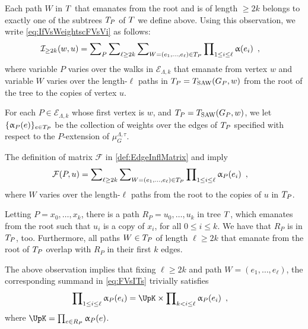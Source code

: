 \documentclass[11pt,reqno]{amsart}
\numberwithin{equation}{section}
\newcommand{\cE}{{\mathcal{E}}}
\newcommand{\cF}{{\mathcal{F}}}
\newcommand{\cI}{{\mathcal{I}}}
\newcommand{\applegreen}[1]{ {\color{applegreen}#1}}
\newcommand{\blue}[1]{{\color{blue}#1}}
\newcommand{\bluepigment}[1]{{\color{blue(pigment)}#1}}
\newcommand{\capri}[1]{{\color{capri}#1}}
\newcommand{\goldenbrown}[1]{{\color{goldenbrown}#1}}
\newcommand{\heliotrope}[1]{{\color{heliotrope}#1}}
\newcommand{\iris}[1]{{\color{iris}#1}}
\newcommand{\red}[1]{{\color{red}#1}}
\newcommand{\ExtV}{\iris{\cE}}
\newcommand{\Tsaw}{T_{\rm SAW}}
\newcommand{\infmatrix}{\cI}
\renewcommand{\applegreen}[1]{#1}
\renewcommand{\blue}[1]{#1}
\renewcommand{\bluepigment}[1]{#1}
\renewcommand{\capri}[1]{#1}
\renewcommand{\goldenbrown}[1]{#1}
\renewcommand{\heliotrope}[1]{#1}
\renewcommand{\iris}[1]{#1}
\renewcommand{\red}[1]{#1}
\newcommand{\ke}{\blue{e}}
\newcommand{\ki}{\capri{i}}
\newcommand{\kk}{\bluepigment{k}}
\newcommand{\kell}{{\color{green(pigment)}\ell}}%
\newcommand{\kP}{\goldenbrown{P}}
\newcommand{\ku}{\red{u}}
\newcommand{\kW}{\blue{W}}
\newcommand{\kw}{\blue{w}}
\newcommand{\kx}{\heliotrope{x}}
\renewcommand{\ke}{e}
\renewcommand{\ki}{i}
\renewcommand{\kk}{k}
\renewcommand{\kell}{\ell}
\renewcommand{\kP}{P}
\renewcommand{\ku}{u}
\renewcommand{\kW}{W}
\renewcommand{\kw}{w}
\renewcommand{\kx}{x}
\newcommand{\SemExtdInfMatrix}{\cF}
\newcommand{\infweight}{\upalpha}
\begin{document}
Each path $\kW$ in $T$ that emanates from the root and is of length $\geq 2\kk$ belongs to exactly one of the subtrees 
$\EMTPw$ of $T$ we define above. Using this observation, we write \eqref{eq:IfVsWeightscFVsVi} as
follows:
%
\begin{align}\label{eq:IfVsWeightscFVsViBB}
\infmatrix_{\geq 2\kk}(\kw,\ku)&=\sum\nolimits_{\kP} \sum\nolimits_{\kell \geq 2\kk}
\sum\nolimits_{\kW=(\ke_1,\ldots, \ke_{\kell}) \in \EMTPw} 
\prod\nolimits_{1\leq i\leq \kell }\infweight(\ke_i) \enspace,
\end{align}
where variable $\kP$ varies over the walks in $\ExtV_{\Lambda,\kk}$ that emanate from vertex $\kw$ and
variable $\kW$ varies over the length-$\kell$ paths in $\EMTPw=\Tsaw(\gext{G}{\kP},\kw)$ from the root of the 
tree to the copies of vertex $\ku$.



For each $\kP\in \ExtV_{\Lambda, \kk}$ whose first vertex is $\kw$, 
%
and $\EMTPw=\Tsaw(\gext{G}{\kP},\kw)$, we let $\{\infweight_{\kP}(\ke)\}_{\ke\in \EMTPw}$ be the 
collection of weights over the edges of $\EMTPw$ specified with respect to the $\kP$-extension of $\mu^{\Lambda,\tau}_G$. 
% 

 
The definition of matrix $\SemExtdInfMatrix$ in \eqref{def:EdgeInflMatrix} and  imply 
\begin{align}\label{eq:FVsITs}
\SemExtdInfMatrix(\kP, \ku)&=\sum\nolimits_{\kell \geq 2\kk}\sum\nolimits_{\kW=(\ke_1,\ldots, \ke_{\kell}) \in \EMTPw} 
\prod\nolimits_{1\leq \ki\leq \kell} \infweight_{\kP}(\ke_{\ki}) \enspace,
\end{align}
where $\kW$ varies over the length-$\kell$ paths from the root to the copies of $\ku$ in $\EMTPw$. 


Letting $\kP=\kx_0,\ldots,\kx_k$, 
there is a path  $R_{\kP}=\ku_0,\ldots, \ku_{\kk}$ in tree $T$, which emanates from the root  such that 
$\ku_{\ki}$ is a copy of $\kx_{\ki}$, for all $0\leq \ki \leq \kk $. 
%
We have that $R_{\kP}$ is in $ \EMTPw$, too. Furthermore, 
all  paths $\kW\in \EMTPw$ of length $\kell\geq 2\kk$ that emanate from the root of $\EMTPw$ overlap with $R_{\kP}$ in  their first $\kk$ edges. 

The above observation implies that fixing $\kell\geq 2\kk$ and path $\kW=(\ke_1,\ldots, \ke_{\kell})$, the corresponding summand in \eqref{eq:FVsITs} trivially satisfies
\begin{align}\label{eq:ProdWeigtPTPBreak}
\prod\nolimits_{1\leq \ki\leq \kell} \infweight_{\kP}(\ke_{\ki}) &= \UpK \times \prod\nolimits_{\kk< \ki\leq \kell } \infweight_{\kP}(\ke_{\ki}) \enspace,
\end{align}
where $\UpK=\prod\nolimits_{\ke \in R_{\kP}} \infweight_{\kP}(\ke)$. 
\end{document}
